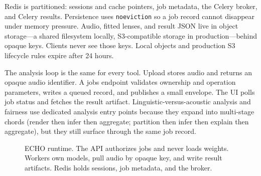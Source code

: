 \documentclass[conference]{IEEEtran}
\begin{document}
Redis is partitioned: sessions and cache pointers, job metadata, the Celery broker, and Celery results. Persistence uses \texttt{noeviction} so a job record cannot disappear under memory pressure. Audio, fitted lenses, and result JSON live in object storage---a shared filesystem locally, S3-compatible storage in production---behind opaque keys. Clients never see those keys. Local objects and production S3 lifecycle rules expire after 24 hours.

The analysis loop is the same for every tool. Upload stores audio and returns an opaque audio identifier. A jobs endpoint validates ownership and operation parameters, writes a queued record, and publishes a small envelope. The UI polls job status and fetches the result artifact. Linguistic-versus-acoustic analysis and fairness use dedicated analysis entry points because they expand into multi-stage chords (render then infer then aggregate; partition then infer then explain then aggregate), but they still surface through the same job record.

\begin{figure}[!t]
\centering
{}
\caption{ECHO runtime. The API authorizes jobs and never loads weights. Workers own models, pull audio by opaque key, and write result artifacts. Redis holds sessions, job metadata, and the broker.}
\label{fig:arch}
\end{figure}
\end{document}
